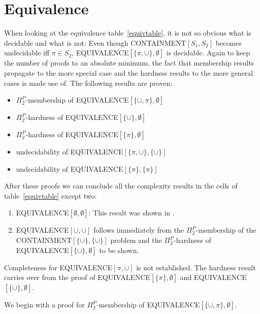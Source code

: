 \section{Equivalence}
When looking at the equivalence table~\ref{equivtable}, it is not so obvious
what is decidable and what is not: Even though CONTAINMENT$[S_1,S_2]$ becomes
undecidable iff $\pi \in S_2$, EQUIVALENCE$[\{\pi,\cup\},\emptyset]$
is decidable. Again to keep the number of proofs to an absolute minimum, the
fact that membership results propagate to the more special case and the hardness
results to the more general cases is made use of.
The following results are proven:
\begin{itemize}
\item $\Pi^P_2$-membership of EQUIVALENCE$[\{\cup,\pi\},\emptyset]$
\item $\Pi^P_2$-hardness of EQUIVALENCE$[\{\cup\},\emptyset]$
\item $\Pi^P_2$-hardness of EQUIVALENCE$[\{\pi\},\emptyset]$
\item undecidability of EQUIVALENCE$[\{\pi,\cup \},\{\cup \}]$
\item undecidability of EQUIVALENCE$[\{\pi\},\{\pi\}]$
\end{itemize}

After these proofs we can conclude all the complexity results in the cells of table~\ref{equivtable}
except two:
\begin{enumerate}
\item EQUIVALENCE$[\emptyset,\emptyset]$: This result was shown in
\cite{letelier2012static}. 
\item EQUIVALENCE$[\cup,\cup]$ follows immediately from the $\Pi^P_2$-membership
of the CONTAINMENT$[\{\cup\}, \{\cup\}]$ problem and the $\Pi^P_2$-hardness of
EQUIVALENCE$[\{\cup\}, \emptyset]$ to be shown.
\end{enumerate}
Completeness for EQUIVALENCE$[\pi,\cup]$ is not established. The hardness result
carries over from the proof of  EQUIVALENCE$[\{\pi\},\emptyset]$ and
EQUIVALENCE$[\{\cup\},\emptyset]$.

We begin with a proof for $\Pi^P_2$-membership of
EQUIVALENCE$[\{\cup,\pi\},\emptyset]$. 

